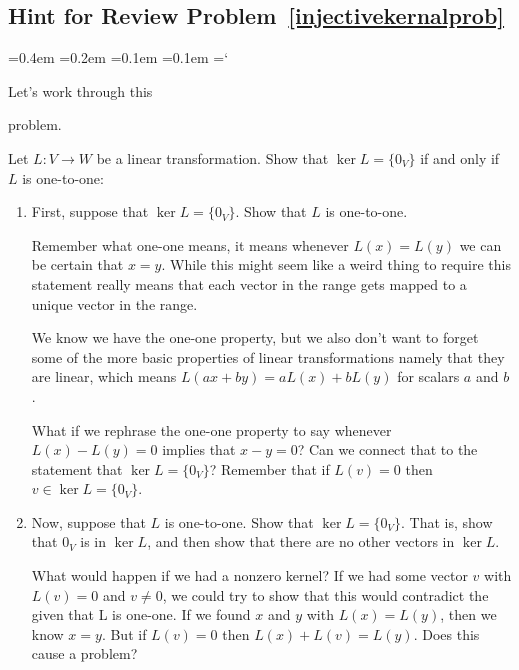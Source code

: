 
\subsection*{Hint for Review Problem~\ref{injectivekernalprob} }

{\ttfamily
{}\font=0.4em
\font=0.2em
\font=0.1em
\font=0.1em
\hyphenchar\font=`\-


\hypertarget{scripts_kernel_range_nullity_rank_hint}{Let's work through this} problem. 

Let $L \colon V\rightarrow W$ be a linear transformation.  Show that $\ker L=\{0_V\}$ if and only if $L$ is one-to-one:
\begin{enumerate}
\item First, suppose that \(\ker L=\{0_V\}\). Show that \(L\) is one-to-one. 

Remember what one-one means, it means whenever $L(x) = L(y)$ we can be certain that $x=y$. While this might seem like a weird thing to require this statement really means that each vector in the range gets mapped to a unique vector in the range. 

We know we have the one-one property, but we also don't want to forget some of the more basic properties of linear transformations namely that they are linear, which means $L(ax+by) = aL(x) + bL(y)$ for scalars $a$ and $b$. 

What if we rephrase the one-one property to say whenever $L(x) -L(y) = 0$ implies that $x-y = 0$? Can we connect that to the statement that $\ker L=\{0_V\}$? Remember that if $L(v) = 0 $ then $v \in \ker L=\{0_V\}$.

\item Now, suppose that \(L\) is one-to-one. Show that \(\ker L=\{0_V\}\). That is, show that \(0_V\) is in \(\ker L\), and then show that there are no other vectors in \(\ker L\).

What would happen if we had a nonzero kernel? If we had some vector $v$ with $L(v) = 0 $ and $v \not = 0 $, we could try to show that this would contradict the given that L is one-one. If we found $x$ and $y$ with $L(x) = L(y)$, then we know $x=y$. But if $L(v) = 0 $ then $L(x) + L(v) = L(y)$. Does this cause a problem?

\end{enumerate}




} %

